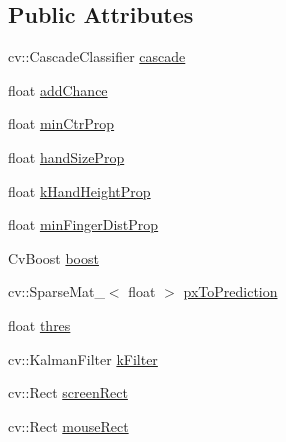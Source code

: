 \subsection*{Public Attributes}
\begin{DoxyCompactItemize}
\item 
cv\-::\-Cascade\-Classifier \hyperlink{classhumancv_1_1_cursor_finder_a5dd2e09ff9ca7e0667d0267d571a31ff}{cascade}
\item 
float \hyperlink{classhumancv_1_1_cursor_finder_ad7607c9dd807d16db9cda9cea42e8dcb}{add\-Chance}
\item 
float \hyperlink{classhumancv_1_1_cursor_finder_aefec5ff071032bfce5d46c4cdedf3f10}{min\-Ctr\-Prop}
\item 
float \hyperlink{classhumancv_1_1_cursor_finder_a647e0325a998393648793c069524454d}{hand\-Size\-Prop}
\item 
float \hyperlink{classhumancv_1_1_cursor_finder_a816167296fd52528605710cccd3336b8}{k\-Hand\-Height\-Prop}
\item 
float \hyperlink{classhumancv_1_1_cursor_finder_a8703da65435e5707559fe59180634b40}{min\-Finger\-Dist\-Prop}
\item 
Cv\-Boost \hyperlink{classhumancv_1_1_cursor_finder_ae280f7953be6afdbd23469443cadfb4b}{boost}
\item 
cv\-::\-Sparse\-Mat\-\_\-$<$ float $>$ \hyperlink{classhumancv_1_1_cursor_finder_acfdb3b111ce4b2780e5a9f9fddf59e97}{px\-To\-Prediction}
\item 
float \hyperlink{classhumancv_1_1_cursor_finder_a77b21640a4c7c1f24da2e39c9ae1a4a7}{thres}
\item 
cv\-::\-Kalman\-Filter \hyperlink{classhumancv_1_1_cursor_finder_af55f31c83c5a619205455801ead7ec73}{k\-Filter}
\item 
cv\-::\-Rect \hyperlink{classhumancv_1_1_cursor_finder_a8a6474e4cf616789f7b14085e83261c8}{screen\-Rect}
\item 
cv\-::\-Rect \hyperlink{classhumancv_1_1_cursor_finder_ac24299e06cd5d271dac727a80bebc5c3}{mouse\-Rect}
\end{DoxyCompactItemize}


